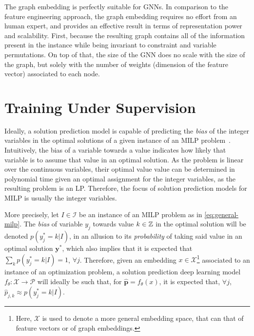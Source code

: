 The graph embedding is perfectly suitable for GNNs.
In comparison to the feature engineering approach, the graph embedding requires no effort from an human expert, and provides an effective result in terms of representation power and scalability.
First, because the resulting graph contains all of the information present in the instance while being invariant to constraint and variable permutations.
On top of that, the size of the GNN does no scale with the size of the graph, but solely with the number of weights (dimension of the feature vector) associated to each node.


\section{Training Under Supervision}

Ideally, a solution prediction model is capable of predicting the \emph{bias} of the integer variables in the optimal solutions of a given instance of an MILP problem~\cite{khalilMIPGNNDataDrivenFramework2022}.
Intuitively, the bias of a variable towards a value indicates how likely that variable is to assume that value in an optimal solution.
As the problem is linear over the continuous variables, their optimal value value can be determined in polynomial time given an optimal assignment for the integer variables, as the resulting problem is an LP.
Therefore, the focus of solution prediction models for MILP is usually the integer variables.

More precisely, let $I\in \mathcal{I}$ be an instance of an MILP problem as in \eqref{eq:general-milp}.
The \emph{bias} of variable $y_j$ towards value $k\in \mathbb{Z}$ in the optimal solution will be denoted $p(y_j^*=k|I)$, in an allusion to its \emph{probability} of taking said value in an optimal solution $\bm{y}^*$, which also implies that it is expected that $\sum_{k} p(y_j^*=k|I) = 1$, $\forall j$.
Therefore, given an embedding $x\in \mathcal{X}$\footnote{Here, $\mathcal{X}$ is used to denote a more general embedding space, that can that of feature vectors or of graph embeddings.} associated to an instance of an optimization problem, a solution prediction deep learning model $f_{\theta}: \mathcal{X} \longrightarrow \mathcal{P}$ will ideally be such that, for $\hat{\bm{p}}=f_\theta(x)$, it is expected that, $\forall j$, $\hat{p}_{j,k}\approx p(y_j^*=k|I)$.

